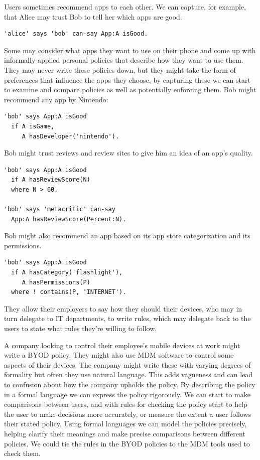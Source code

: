 \documentclass[thesis.tex]{subfiles}
\begin{document}
Users sometimes recommend apps to each other. We can capture, for example, that
Alice may trust Bob to tell her which apps are good.
%
\begin{lstlisting}
'alice' says 'bob' can-say App:A isGood.
\end{lstlisting}
%
Some may consider what apps they want to use on their phone and come up with
informally applied personal policies that describe how they want to use them.
They may never write these policies down, but they might take the form of
preferences that influence the apps they choose, by capturing these we can start
to examine and compare policies as well as potentially enforcing them. Bob might recommend any app by Nintendo:
%
\begin{lstlisting}
'bob' says App:A isGood
  if A isGame,
     A hasDeveloper('nintendo').
\end{lstlisting}
%
Bob might trust reviews and review sites to give him an idea of an app's quality. 
%
\begin{lstlisting}
'bob' says App:A isGood
  if A hasReviewScore(N)
  where N > 60.
 
'bob' says 'metacritic' can-say
  App:A hasReviewScore(Percent:N).
\end{lstlisting}
%
Bob might also recommend an app based on its app store categorization and its permissions.
%
\begin{lstlisting}
'bob' says App:A isGood
  if A hasCategory('flashlight'),
     A hasPermissions(P)
  where ! contains(P, 'INTERNET').
\end{lstlisting}

They allow their employers to say how they should their devices, who
may in turn delegate to IT departments, to write rules, which may
delegate back to the users to state what rules they're willing to
follow.

A company looking to control their employee's mobile devices at work might write
a \ac{BYOD} policy. They might also use \ac{MDM} software to control some
aspects of their devices. The company might write these with varying degrees of
formality but often they use natural language. This adds vagueness
and can lead to confusion about how the company upholds the policy. By
describing the policy in a formal language we can express the policy
rigorously. We can start to make comparisons between users, and with rules
for checking the policy start to help the user to make decisions more
accurately, or measure the extent a user follows their stated policy. Using
formal languages we can model the policies precisely, helping clarify their
meanings and make precise comparisons between different policies. We could tie the
rules in the \ac{BYOD} policies to the \ac{MDM} tools used to
check them.
\end{document}
